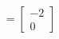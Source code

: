 \documentclass[preview]{standalone}
\begin{document}
\begin{center}
\[= \begin{bmatrix} -2 \\ 0 \end{bmatrix}\]
\end{center}
\end{document}

